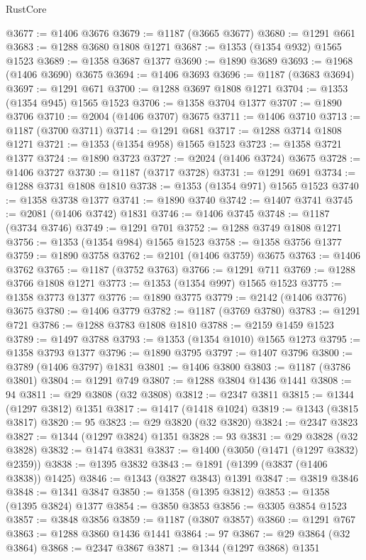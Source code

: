 \begin{lexlean}{RustCore}
\begin{coremodule}
@3677 := @1406 @3676
@3679 := @1187 (@3665 @3677)
@3680 := @1291 @661
@3683 := @1288 @3680 @1808 @1271
@3687 := @1353 (@1354 @932) @1565 @1523
@3689 := @1358 @3687 @1377
@3690 := @1890 @3689
@3693 := @1968 (@1406 @3690) @3675
@3694 := @1406 @3693
@3696 := @1187 (@3683 @3694)
@3697 := @1291 @671
@3700 := @1288 @3697 @1808 @1271
@3704 := @1353 (@1354 @945) @1565 @1523
@3706 := @1358 @3704 @1377
@3707 := @1890 @3706
@3710 := @2004 (@1406 @3707) @3675
@3711 := @1406 @3710
@3713 := @1187 (@3700 @3711)
@3714 := @1291 @681
@3717 := @1288 @3714 @1808 @1271
@3721 := @1353 (@1354 @958) @1565 @1523
@3723 := @1358 @3721 @1377
@3724 := @1890 @3723
@3727 := @2024 (@1406 @3724) @3675
@3728 := @1406 @3727
@3730 := @1187 (@3717 @3728)
@3731 := @1291 @691
@3734 := @1288 @3731 @1808 @1810
@3738 := @1353 (@1354 @971) @1565 @1523
@3740 := @1358 @3738 @1377
@3741 := @1890 @3740
@3742 := @1407 @3741
@3745 := @2081 (@1406 @3742) @1831
@3746 := @1406 @3745
@3748 := @1187 (@3734 @3746)
@3749 := @1291 @701
@3752 := @1288 @3749 @1808 @1271
@3756 := @1353 (@1354 @984) @1565 @1523
@3758 := @1358 @3756 @1377
@3759 := @1890 @3758
@3762 := @2101 (@1406 @3759) @3675
@3763 := @1406 @3762
@3765 := @1187 (@3752 @3763)
@3766 := @1291 @711
@3769 := @1288 @3766 @1808 @1271
@3773 := @1353 (@1354 @997) @1565 @1523
@3775 := @1358 @3773 @1377
@3776 := @1890 @3775
@3779 := @2142 (@1406 @3776) @3675
@3780 := @1406 @3779
@3782 := @1187 (@3769 @3780)
@3783 := @1291 @721
@3786 := @1288 @3783 @1808 @1810
@3788 := @2159 @1459 @1523
@3789 := @1497 @3788
@3793 := @1353 (@1354 @1010) @1565 @1273
@3795 := @1358 @3793 @1377
@3796 := @1890 @3795
@3797 := @1407 @3796
@3800 := @3789 (@1406 @3797) @1831
@3801 := @1406 @3800
@3803 := @1187 (@3786 @3801)
@3804 := @1291 @749
@3807 := @1288 @3804 @1436 @1441
@3808 := 94
@3811 := @29 @3808 (@32 @3808)
@3812 := @2347 @3811
@3815 := @1344 (@1297 @3812) @1351
@3817 := @1417 (@1418 @1024)
@3819 := @1343 (@3815 @3817)
@3820 := 95
@3823 := @29 @3820 (@32 @3820)
@3824 := @2347 @3823
@3827 := @1344 (@1297 @3824) @1351
@3828 := 93
@3831 := @29 @3828 (@32 @3828)
@3832 := @1474 @3831
@3837 := @1400 (@3050 (@1471 (@1297 @3832) @2359))
@3838 := @1395 @3832
@3843 := @1891 (@1399 (@3837 (@1406 @3838)) @1425)
@3846 := @1343 (@3827 @3843) @1391
@3847 := @3819 @3846
@3848 := @1341 @3847
@3850 := @1358 (@1395 @3812)
@3853 := @1358 (@1395 @3824) @1377
@3854 := @3850 @3853
@3856 := @3305 @3854 @1523
@3857 := @3848 @3856
@3859 := @1187 (@3807 @3857)
@3860 := @1291 @767
@3863 := @1288 @3860 @1436 @1441
@3864 := 97
@3867 := @29 @3864 (@32 @3864)
@3868 := @2347 @3867
@3871 := @1344 (@1297 @3868) @1351

\end{coremodule}
\end{lexlean}
